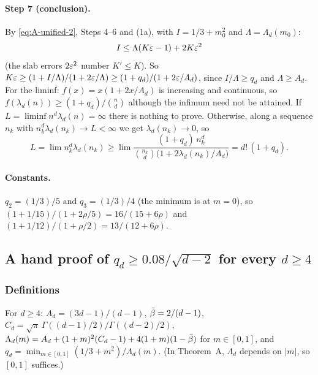 \paragraph{Step 7 (conclusion).} By \eqref{eq:A-unified-2}, Steps 4--6 and (1a), with
$I = 1/3 + m_0^2$ and $\Lambda = \Lambda_d(m_0)$:
\begin{equation*}
  I \le \Lambda(K\varepsilon - 1) + 2K\varepsilon^2
\end{equation*}
(the slab errors $2\varepsilon^2$ number $K' \le K$). So $K\varepsilon \ge (1 + I/\Lambda)/(1 + 2\varepsilon/\Lambda) \ge (1 + q_d)/(1 + 2\varepsilon/A_d)$, since
$I/\Lambda \ge q_d$ and $\Lambda \ge A_d$. For the liminf: $f(x) = x(1 + 2x/A_d)$ is increasing
and continuous, so $f(\lambda_d(n)) \ge (1 + q_d)/\binom{n}{d}$ although the infimum need not be
attained. If $L = \liminf n^d \lambda_d(n) = \infty$ there is nothing to prove. Otherwise, along a
sequence $n_k$ with $n_k^d \lambda_d(n_k) \to L < \infty$ we get $\lambda_d(n_k) \to 0$, so
\begin{equation*}
  L = \lim n_k^d \lambda_d(n_k)
    \ge \lim \frac{(1 + q_d)\, n_k^d}{\binom{n_k}{d}\bigl(1 + 2\lambda_d(n_k)/A_d\bigr)}
    = d!\,(1 + q_d). \tag*{\qedsymbol}
\end{equation*}

\paragraph{Constants.} $q_2 = (1/3)/5$ and $q_3 = (1/3)/4$ (the minimum is at $m = 0$), so
$(1 + 1/15)/(1 + 2\rho/5) = 16/(15 + 6\rho)$ and $(1 + 1/12)/(1 + \rho/2) = 13/(12 + 6\rho)$.

\subsection{\texorpdfstring{A hand proof of $q_d \ge 0.08/\sqrt{d-2}$ for every $d \ge 4$}%
{A hand proof of q\_d >= 0.08/sqrt(d-2) for every d >= 4}}
\label{sec:A-qd}

\subsubsection*{Definitions}

For $d \ge 4$: $A_d = (3d-1)/(d-1)$, $\bar\beta = 2/(d-1)$,
$C_d = \sqrt{\pi}\, \Gamma((d-1)/2)/\Gamma((d-2)/2)$,
$\Lambda_d(m) = A_d + (1+m)^2(C_d - 1) + 4(1+m)(1 - \bar\beta)$ for $m \in [0, 1]$, and
$q_d = \min_{m \in [0,1]} (1/3 + m^2)/\Lambda_d(m)$. (In Theorem~A, $\Lambda_d$ depends on $|m|$,
so $[0, 1]$ suffices.)


